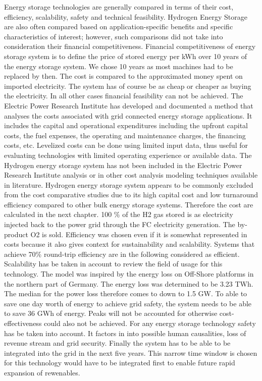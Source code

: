 \documentclass[12pt,a4paper]{article}
\begin{document}
\begin{parcolumns}[colwidths={1=2.5 cm, 2=10 cm, 3=2.5cm}]{3}
{Energy storage technologies are generally compared in terms of their cost, efficiency, scalability, safety and technical feasibility. Hydrogen Energy Storage are also often compared based on application-specific benefits and specific characteristics of interest; however, such comparisons did not take into consideration their financial competitiveness. Financial competitiveness of energy storage system is to define the price of stored energy per kWh over 10 years of the energy storage system. We chose 10 years as most machines had to be replaced by then. The cost is compared to the approximated money spent on imported electricity. The system has of course be as cheap or cheaper as buying the electricity. In all other cases financial feasibility can not be achieved. The Electric Power Research Institute has developed and documented a method that analyses the costs associated with grid connected energy storage applications. It includes the capital and operational expenditures including the upfront capital costs, the fuel expenses, the operating and maintenance charges, the financing costs, etc. Levelized costs can be done using limited input data, thus useful for evaluating technologies with limited operating experience or available data. The Hydrogen energy storage system has not been included in the Electric Power Research Institute analysis or in other cost analysis modeling techniques available in literature. Hydrogen energy storage system appears to be commonly excluded from the cost comparative studies due to its high capital cost and low turnaround efficiency compared to other bulk energy storage systems.  Therefore the cost are calculated in the next chapter. 100 \% of the H2 gas stored is as electricity injected back to the power grid through the FC electricity generation. The by-product O2 is sold. Efficiency was chosen even if it is somewhat represented in costs because it also gives context for sustainability and scalability. Systems that achieve 70\% round-trip efficiency are in the following considered as efficient. Scalability has be taken in account to review the field of usage for this technology. The model was inspired by the energy loss on Off-Shore platforms in the northern part of Germany. The energy loss was determined to be 3.23 TWh. The median for the power loss therefore comes to down to 1.5 GW. To able to save one day worth of energy to achieve grid safety, the system needs to be able to save 36 GWh of energy. Peaks will not be accounted for otherwise cost-effectiveness could also not be achieved. For any energy storage technology safety has be taken into account. It factors in into possible human causalities, loss of revenue stream and grid security. Finally the system has to be able to be integrated into the grid in the next five years. This narrow time window is chosen for this technology would have to be integrated first to enable future rapid expansion of rewenables.\\

}
\end{parcolumns}
\end{document}
